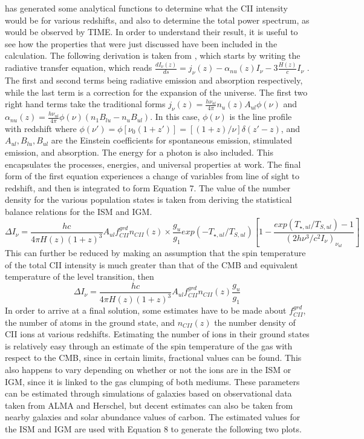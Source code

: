\documentclass[manuscript]{aastex}
\begin{document}
\cite{Gong2012} has generated some analytical functions to determine what the CII intensity would be for various redshifts, and also to determine the total power spectrum, as would be observed by TIME. In order to understand their result, it is useful to see how the properties that were just discussed have been included in the calculation. The following derivation is taken from \cite{Gong2012}, which starts by writing the radiative transfer equation, which reads \(\frac{dI_{\nu}(z)}{ds} = j_{\nu}(z) - \alpha_{nu}(z)I_{\nu} - 3 \frac{H(z)}{c}I_{\nu}\) . The first and second terms being radiative emission and absorption respectively, while the last term is a correction for the expansion of the universe. The first two right hand terms take the traditional forms \(j_{\nu}(z) = \frac{h\nu_{ul}}{4 \pi} n_{u}(z) A_{ul}\phi(\nu)\) and \(\alpha_{nu}(z) = \frac{h\nu_{ul}}{4 \pi} \phi(\nu)(n_{1}B_{lu} - n_{u}B_{ul})\). In this case, $\phi(\nu)$ is the line profile with redshift where \(\phi(\nu') = \phi[\nu_{0}(1+z')] = [(1+z)/\nu]\delta(z'-z)\),  and $A_{ul},B_{lu},B_{ul}$ are the Einstein coefficients for spontaneous emission, stimulated emission, and absorption. The energy for a photon is also included. This encapsulates the processes, energies, and universal properties at work. The final form of the first equation experiences a change of variables from line of sight to redshift, and then is integrated to form Equation 7. The value of the number density for the various population states is taken from deriving the statistical balance relations for the ISM and IGM. 
\begin{equation}
\Delta I_{\nu} = \frac{h c}{4 \pi H(z) (1+z)^{3}} A_{ul} f_{CII}^{grd} n_{CII}(z) \times \frac{g_{u}}{g_{1}} exp(-T_{\star,ul}/T_{S,ul})[1-\frac{exp(T_{\star,ul}/T_{S,ul}) - 1}{(2h\nu^{3}/c^{2}I_{\nu})_{\nu_{ul}}}]
\end{equation}
This can further be reduced by making an assumption that the spin temperature of the total CII intensity is much greater than that of the CMB and equivalent temperature of the level transition, then 
\begin{equation}
\Delta I_{\nu} = \frac{h c}{4 \pi H(z) (1+z)^{3}} A_{ul} f_{CII}^{grd} n_{CII}(z) \frac{g_{u}}{g_{1}} 
\end{equation}
In order to arrive at a final solution, some estimates have to be made about  $f_{CII}^{grd}$, the number of atoms in the ground state, and $n_{CII}(z)$ the number density of CII ions at various redshifts. Estimating the number of ions in their ground states is relatively easy through an estimate of the spin temperature of the gas with respect to the CMB, since in certain limits, fractional values can be found. This also happens to vary depending on whether or not the ions are in the ISM or IGM, since it is linked to the gas clumping of both mediums. These parameters can be estimated through simulations of galaxies based on observational data taken from ALMA and Herschel, but decent estimates can also be taken from nearby galaxies and solar abundance values of carbon. The estimated values for the ISM and IGM are used with Equation 8 to generate the following two plots.
\end{document}
